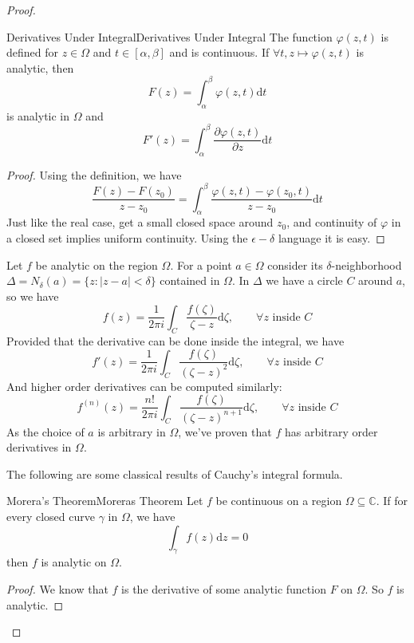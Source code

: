 \documentclass[../main.tex]{subfiles}
\begin{document}
\begin{proof}
\begin{lemma}{Derivatives Under Integral}{Derivatives Under Integral}
	The function $\varphi(z,t)$ is defined for $z\in \Omega$ and $t\in [\alpha,\beta]$ and is continuous. If $\forall t, z \mapsto \varphi(z,t)$ is analytic, then
	\begin{equation}
	F(z) = \int_{\alpha}^{\beta} \varphi(z,t) \mathrm{d} t
	\end{equation}
	is analytic in $\Omega$ and
	\begin{equation}
	F'(z) = \int_{\alpha}^{\beta} \frac{\partial \varphi(z,t)}{\partial z}\mathrm{d} t
	\end{equation}
\end{lemma}
\begin{proof}
	Using the definition, we have
	\begin{equation*}
	\frac{F(z)-F(z_0)}{z-z_0} = \int_{\alpha}^{\beta} \frac{\varphi(z,t)-\varphi(z_0,t)}{z-z_0} \mathrm{d} t
	\end{equation*}
	Just like the real case, get a small closed space around $z_0$, and continuity of $\varphi$ in a closed set implies uniform continuity. Using the $\epsilon-\delta$ language it is easy.
\end{proof}

Let $f$ be analytic on the region $\Omega$. For a point $a\in \Omega$ consider its $\delta$-neighborhood $\Delta = N_\delta(a) = \{ z: |z-a|<\delta \}$ contained in $\Omega$.  In $\Delta$ we have a circle $C$ around $a$, so we have
\begin{equation*}
	f(z) = \frac{1}{2 \pi i} \int_C \frac{f(\zeta)}{\zeta - z} \mathrm{d} \zeta, \qquad \forall z \text{ inside }C
\end{equation*}
Provided that the derivative can be done inside the integral, we have
\begin{equation}
	f'(z) = \frac{1}{2 \pi i} \int_C \frac{f(\zeta)}{(\zeta - z)^2} \mathrm{d} \zeta, \qquad \forall z \text{ inside }C
\end{equation}
And higher order derivatives can be computed similarly:
\begin{equation}\label{eq:Cauchy's Integral Formula for Derivatives}
	f^{(n)}(z) = \frac{n!}{2 \pi i} \int_C \frac{f(\zeta)}{(\zeta - z)^{n+1}} \mathrm{d} \zeta, \qquad \forall z \text{ inside }C
\end{equation}
As the choice of $a$ is arbitrary in $\Omega$, we've proven that $f$ has arbitrary order derivatives in $\Omega$.

The following are some classical results of Cauchy's integral formula.
\begin{theorem}{Morera's Theorem}{Moreras Theorem}
	Let $f$ be continuous on a region $\Omega \subseteq \mathbb{C}$. If for every closed curve $\gamma$ in $\Omega$, we have
	\begin{equation}
		\int_{\gamma} f(z) \mathrm{d} z = 0
	\end{equation}
	then $f$ is analytic on $\Omega$.
\end{theorem}
\begin{proof}
We know that $f$ is the derivative of some analytic function $F$ on $\Omega$. So $f$ is analytic.
\end{proof}


\end{proof}
\end{document}
